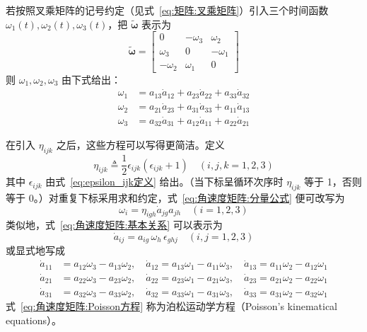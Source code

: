 若按照叉乘矩阵的记号约定（见式~\eqref{eq:矩阵:叉乘矩阵}）引入三个时间函数 $\omega_1(t),\omega_2(t),\omega_3(t)$，把 $\bm{\tilde{\omega}}$ 表示为
\begin{equation}
    \bm{\tilde{\omega}}=\begin{bmatrix}
        0&-\omega_3&\omega_2\\
        \omega_3&0&-\omega_1\\
        -\omega_2&\omega_1&0
    \end{bmatrix}
    \label{eq:角速度矩阵:反对称形式}
\end{equation}
则 $\omega_1,\omega_2,\omega_3$ 由下式给出：
\begin{equation}
    \begin{aligned}
        \omega_{1}&=a_{13}\dot{a}_{12}+a_{23}\dot{a}_{22}+a_{33}\dot{a}_{32}\\
        \omega_{2}&=a_{21}\dot{a}_{23}+a_{31}\dot{a}_{33}+a_{11}\dot{a}_{13}\\
        \omega_{3}&=a_{32}\dot{a}_{31}+a_{12}\dot{a}_{11}+a_{22}\dot{a}_{21}
    \end{aligned}
    \label{eq:角速度矩阵:分量公式}
\end{equation}

在引入 $\eta_{ijk}$ 之后，这些方程可以写得更简洁。定义
\begin{equation}
    \eta_{ijk}\triangleq\frac{1}{2}\epsilon_{ijk}(\epsilon_{ijk}+1)\quad(i,j,k=1,2,3)
    \label{eq:角速度矩阵:eta定义}
\end{equation}
其中 $\epsilon_{ijk}$ 由式~\eqref{eq:epsilon_ijk定义} 给出。（当下标呈循环次序时 $\eta_{ijk}$ 等于 1，否则等于 0。）对重复下标采用求和约定，式~\eqref{eq:角速度矩阵:分量公式} 便可改写为
\begin{equation}
    \omega_{i}=\eta_{igh}\dot{a}_{jg}a_{jh}\quad(i=1,2,3)
    \label{eq:角速度矩阵:紧凑形式}
\end{equation}
类似地，式~\eqref{eq:角速度矩阵:基本关系} 可以表示为
\begin{equation}
    \dot{a}_{ij}=a_{ig}\,\omega_{h}\,\epsilon_{ghj}\quad(i,j=1,2,3)
    \label{eq:角速度矩阵:紧凑形式2}
\end{equation}
或显式地写成
\begin{equation}
    \begin{aligned}
        \dot{a}_{11}&=a_{12}\omega_{3}-a_{13}\omega_{2},\quad
        \dot{a}_{12}=a_{13}\omega_{1}-a_{11}\omega_{3},\quad
        \dot{a}_{13}=a_{11}\omega_{2}-a_{12}\omega_{1}\\
        \dot{a}_{21}&=a_{22}\omega_{3}-a_{23}\omega_{2},\quad
        \dot{a}_{22}=a_{23}\omega_{1}-a_{21}\omega_{3},\quad
        \dot{a}_{23}=a_{21}\omega_{2}-a_{22}\omega_{1}\\
        \dot{a}_{31}&=a_{32}\omega_{3}-a_{33}\omega_{2},\quad
        \dot{a}_{32}=a_{33}\omega_{1}-a_{31}\omega_{3},\quad
        \dot{a}_{33}=a_{31}\omega_{2}-a_{32}\omega_{1}
    \end{aligned}
    \label{eq:角速度矩阵:Poisson方程}
\end{equation}
式~\eqref{eq:角速度矩阵:Poisson方程} 称为泊松运动学方程（Poisson's kinematical equations）。

